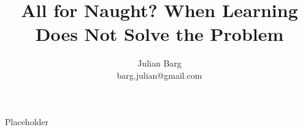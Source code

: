 \documentclass[12pt, man, natbib]{apa6}
\title{All for Naught? When Learning Does Not Solve the Problem}
\author{Julian Barg\\barg.julian@gmail.com}
\affiliation{Ivey Business School}
\begin{document}
	
	\maketitle
	
	\singlespacing
	
	\section{}
	
	Placeholder
	
	
	
\end{document}
